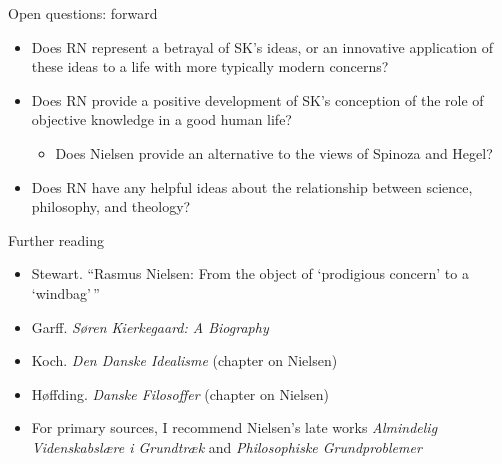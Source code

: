 \documentclass[ignorenonframetext, ]{beamer}
\begin{document}
\begin{frame}{Open questions: forward}

\begin{itemize}
\item Does RN represent a betrayal of SK's ideas, or an innovative
  application of these ideas to a life with more typically modern
  concerns?
\item
  Does RN provide a positive development of SK's conception of the role
  of objective knowledge in a good human life?
  \begin{itemize}
  \item Does Nielsen provide an alternative to the views of Spinoza
    and Hegel?
  \end{itemize}
\item Does RN have any helpful ideas about the relationship between
  science, philosophy, and theology?
\end{itemize}
\end{frame}

\begin{frame}{Further reading}

  \begin{itemize}
  \item Stewart. ``Rasmus Nielsen: From the object of `prodigious
    concern' to a `windbag'\,''
  \item Garff. \textit{Søren Kierkegaard: A Biography}
  \item Koch. \emph{Den Danske Idealisme} (chapter on
    Nielsen)
  \item Høffding. \emph{Danske Filosoffer} (chapter on Nielsen)
  \item For primary sources, I recommend Nielsen's late works
    \textit{Almindelig Videnskabslære i Grundtræk} and
    \textit{Philosophiske Grundproblemer}
  \end{itemize}

\end{frame}
\end{document}
